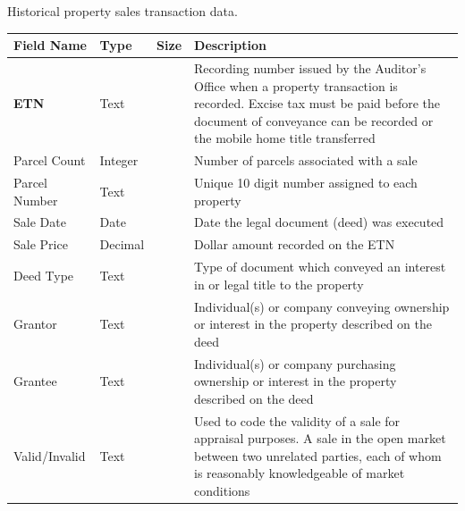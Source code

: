 \documentclass[
  english,
  letterpaper,
  DIV=11,
  numbers=noendperiod]{scrreprt}
\newcounter{none} %
\begin{document}
Historical property sales transaction data.

{\def\LTcaptype{none} %
\begin{longtable}[]{@{}
  >{\raggedright\arraybackslash}p{}
  >{\raggedright\arraybackslash}p{}
  >{\raggedright\arraybackslash}p{}
  >{\raggedright\arraybackslash}p{}@{}}
\toprule\noalign{}
\begin{minipage}[b]{\linewidth}\raggedright
Field Name
\end{minipage} & \begin{minipage}[b]{\linewidth}\raggedright
Type
\end{minipage} & \begin{minipage}[b]{\linewidth}\raggedright
Size
\end{minipage} & \begin{minipage}[b]{\linewidth}\raggedright
Description
\end{minipage} \\
\midrule\noalign{}
\endhead
\bottomrule\noalign{}
\endlastfoot
\textbf{ETN} & Text & 11 & Recording number issued by the Auditor's
Office when a property transaction is recorded. Excise tax must be paid
before the document of conveyance can be recorded or the mobile home
title transferred \\
Parcel Count & Integer & & Number of parcels associated with a sale \\
Parcel Number & Text & 10 & Unique 10 digit number assigned to each
property \\
Sale Date & Date & & Date the legal document (deed) was executed \\
Sale Price & Decimal & 15.2 & Dollar amount recorded on the ETN \\
Deed Type & Text & 40 & Type of document which conveyed an interest in
or legal title to the property \\
Grantor & Text & 80 & Individual(s) or company conveying ownership or
interest in the property described on the deed \\
Grantee & Text & 80 & Individual(s) or company purchasing ownership or
interest in the property described on the deed \\
Valid/Invalid & Text & 7 & Used to code the validity of a sale for
appraisal purposes. A sale in the open market between two unrelated
parties, each of whom is reasonably knowledgeable of market conditions

\end{longtable}}
\end{document}
